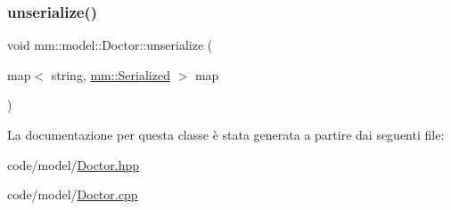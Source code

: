 \subsubsection{\texorpdfstring{unserialize()}{unserialize()}}
{\footnotesize\ttfamily void mm\+::model\+::\+Doctor\+::unserialize (\begin{DoxyParamCaption}\item[{map$<$ string, \mbox{\hyperlink{structmm_1_1_serialized}{mm\+::\+Serialized}} $>$}]{map }\end{DoxyParamCaption})\hspace{0.3cm}{\ttfamily [override]}}



La documentazione per questa classe è stata generata a partire dai seguenti file\+:\begin{DoxyCompactItemize}
\item 
code/model/\mbox{\hyperlink{_doctor_8hpp}{Doctor.\+hpp}}\item 
code/model/\mbox{\hyperlink{_doctor_8cpp}{Doctor.\+cpp}}\end{DoxyCompactItemize}
